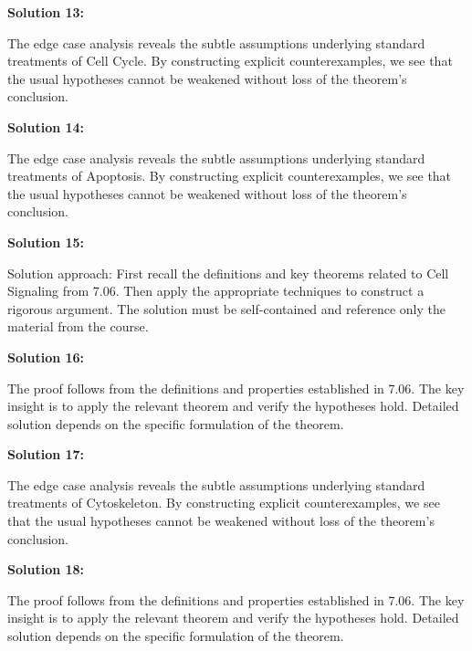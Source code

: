 \documentclass[12pt,a4paper]{exam}
\begin{document}
\vspace{0.5cm}

\textbf{Solution 13:}

The edge case analysis reveals the subtle assumptions underlying standard treatments of Cell Cycle. By constructing explicit counterexamples, we see that the usual hypotheses cannot be weakened without loss of the theorem's conclusion.

\vspace{0.5cm}

\textbf{Solution 14:}

The edge case analysis reveals the subtle assumptions underlying standard treatments of Apoptosis. By constructing explicit counterexamples, we see that the usual hypotheses cannot be weakened without loss of the theorem's conclusion.

\vspace{0.5cm}

\textbf{Solution 15:}

Solution approach: First recall the definitions and key theorems related to Cell Signaling from 7.06. Then apply the appropriate techniques to construct a rigorous argument. The solution must be self-contained and reference only the material from the course.

\vspace{0.5cm}

\textbf{Solution 16:}

The proof follows from the definitions and properties established in 7.06. The key insight is to apply the relevant theorem and verify the hypotheses hold. Detailed solution depends on the specific formulation of the theorem.

\vspace{0.5cm}

\textbf{Solution 17:}

The edge case analysis reveals the subtle assumptions underlying standard treatments of Cytoskeleton. By constructing explicit counterexamples, we see that the usual hypotheses cannot be weakened without loss of the theorem's conclusion.

\vspace{0.5cm}

\textbf{Solution 18:}

The proof follows from the definitions and properties established in 7.06. The key insight is to apply the relevant theorem and verify the hypotheses hold. Detailed solution depends on the specific formulation of the theorem.
\end{document}
